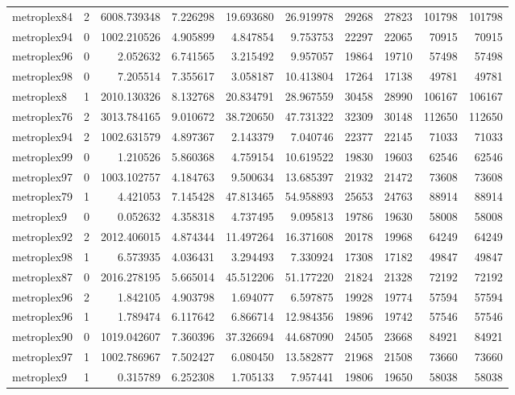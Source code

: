 \begin{longtable}{|l|r|r|r|r|r|r|r|r|r|}
metroplex84 & 2 & 6008.739348 & 7.226298 & 19.693680 & 26.919978 & 29268 & 27823 & 101798 & 101798 \\
metroplex94 & 0 & 1002.210526 & 4.905899 & 4.847854 & 9.753753 & 22297 & 22065 & 70915 & 70915 \\
metroplex96 & 0 & 2.052632 & 6.741565 & 3.215492 & 9.957057 & 19864 & 19710 & 57498 & 57498 \\
metroplex98 & 0 & 7.205514 & 7.355617 & 3.058187 & 10.413804 & 17264 & 17138 & 49781 & 49781 \\
metroplex8 & 1 & 2010.130326 & 8.132768 & 20.834791 & 28.967559 & 30458 & 28990 & 106167 & 106167 \\
metroplex76 & 2 & 3013.784165 & 9.010672 & 38.720650 & 47.731322 & 32309 & 30148 & 112650 & 112650 \\
metroplex94 & 2 & 1002.631579 & 4.897367 & 2.143379 & 7.040746 & 22377 & 22145 & 71033 & 71033 \\
metroplex99 & 0 & 1.210526 & 5.860368 & 4.759154 & 10.619522 & 19830 & 19603 & 62546 & 62546 \\
metroplex97 & 0 & 1003.102757 & 4.184763 & 9.500634 & 13.685397 & 21932 & 21472 & 73608 & 73608 \\
metroplex79 & 1 & 4.421053 & 7.145428 & 47.813465 & 54.958893 & 25653 & 24763 & 88914 & 88914 \\
metroplex9 & 0 & 0.052632 & 4.358318 & 4.737495 & 9.095813 & 19786 & 19630 & 58008 & 58008 \\
metroplex92 & 2 & 2012.406015 & 4.874344 & 11.497264 & 16.371608 & 20178 & 19968 & 64249 & 64249 \\
metroplex98 & 1 & 6.573935 & 4.036431 & 3.294493 & 7.330924 & 17308 & 17182 & 49847 & 49847 \\
metroplex87 & 0 & 2016.278195 & 5.665014 & 45.512206 & 51.177220 & 21824 & 21328 & 72192 & 72192 \\
metroplex96 & 2 & 1.842105 & 4.903798 & 1.694077 & 6.597875 & 19928 & 19774 & 57594 & 57594 \\
metroplex96 & 1 & 1.789474 & 6.117642 & 6.866714 & 12.984356 & 19896 & 19742 & 57546 & 57546 \\
metroplex90 & 0 & 1019.042607 & 7.360396 & 37.326694 & 44.687090 & 24505 & 23668 & 84921 & 84921 \\
metroplex97 & 1 & 1002.786967 & 7.502427 & 6.080450 & 13.582877 & 21968 & 21508 & 73660 & 73660 \\
metroplex9 & 1 & 0.315789 & 6.252308 & 1.705133 & 7.957441 & 19806 & 19650 & 58038 & 58038 \\

\end{longtable}
